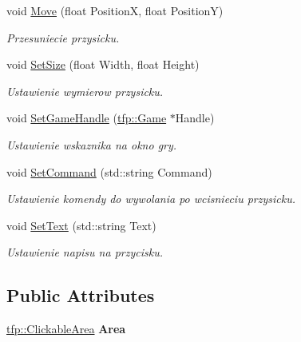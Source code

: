 \begin{DoxyCompactItemize}
void \mbox{\hyperlink{classtfp_1_1_button_a3aac1fa8da8f084fb1b845f5f4ea1ae0}{Move}} (float PositionX, float PositionY)
\begin{DoxyCompactList}\small\item\em Przesuniecie przysicku. \end{DoxyCompactList}\item 
\mbox{\label{classtfp_1_1_button_a72b4a2a0618c6eec992278186512366a}} 
void \mbox{\hyperlink{classtfp_1_1_button_a72b4a2a0618c6eec992278186512366a}{Set\+Size}} (float Width, float Height)
\begin{DoxyCompactList}\small\item\em Ustawienie wymierow przysicku. \end{DoxyCompactList}\item 
\mbox{\label{classtfp_1_1_button_ad85364244c9006f657106e8e34197538}} 
void \mbox{\hyperlink{classtfp_1_1_button_ad85364244c9006f657106e8e34197538}{Set\+Game\+Handle}} (\mbox{\hyperlink{classtfp_1_1_game}{tfp\+::\+Game}} $\ast$Handle)
\begin{DoxyCompactList}\small\item\em Ustawienie wskaznika na okno gry. \end{DoxyCompactList}\item 
\mbox{\label{classtfp_1_1_button_a07bd1a5d37abc673e50eaeb16c34f25a}} 
void \mbox{\hyperlink{classtfp_1_1_button_a07bd1a5d37abc673e50eaeb16c34f25a}{Set\+Command}} (std\+::string Command)
\begin{DoxyCompactList}\small\item\em Ustawienie komendy do wywolania po wcisnieciu przysicku. \end{DoxyCompactList}\item 
\mbox{\label{classtfp_1_1_button_a30a46c1262b2da213c3bea32946a92df}} 
void \mbox{\hyperlink{classtfp_1_1_button_a30a46c1262b2da213c3bea32946a92df}{Set\+Text}} (std\+::string Text)
\begin{DoxyCompactList}\small\item\em Ustawienie napisu na przycisku. \end{DoxyCompactList}\end{DoxyCompactItemize}
\subsection*{Public Attributes}
\begin{DoxyCompactItemize}
\item 
\mbox{\label{classtfp_1_1_button_a6a63688a207e9198e7484c27f5d44dc8}} 
\mbox{\hyperlink{classtfp_1_1_clickable_area}{tfp\+::\+Clickable\+Area}} {\bfseries Area}
\end{DoxyCompactItemize}


